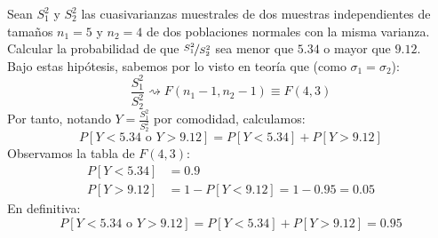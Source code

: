 \begin{ejercicio}
    Sean $S_1^2$ y $S_2^2$ las cuasivarianzas muestrales de dos muestras independientes de tamaños $n_1 = 5$ y $n_2 = 4$ de dos poblaciones normales con la misma varianza. Calcular la probabilidad de que $\nicefrac{S_1^2}{S_2^2}$ sea menor que $5.34$ o mayor que $9.12$.\\

    \noindent
    Bajo estas hipótesis, sabemos por lo visto en teoría que (como $\sigma_1=\sigma_2$):
    \begin{equation*}
        \dfrac{S_1^2}{S_2^2} \rightsquigarrow F(n_1-1, n_2-1) \equiv F(4,3)
    \end{equation*}
    Por tanto, notando $Y = \frac{S_1^2}{S_2^2}$ por comodidad, calculamos:
    \begin{equation*}
        P[Y < 5.34 \text{\ o\ } Y>9.12] = P[Y<5.34] + P[Y>9.12]
    \end{equation*}
    Observamos la tabla de $F(4,3)$:
    \begin{align*}
        P[Y<5.34] &= 0.9 \\
        P[Y>9.12] &= 1-P[Y<9.12] = 1-0.95 = 0.05
    \end{align*}
    En definitiva:
    \begin{equation*}
        P[Y < 5.34 \text{\ o\ } Y>9.12] = P[Y<5.34] + P[Y>9.12] = 0.95
    \end{equation*}
\end{ejercicio}

